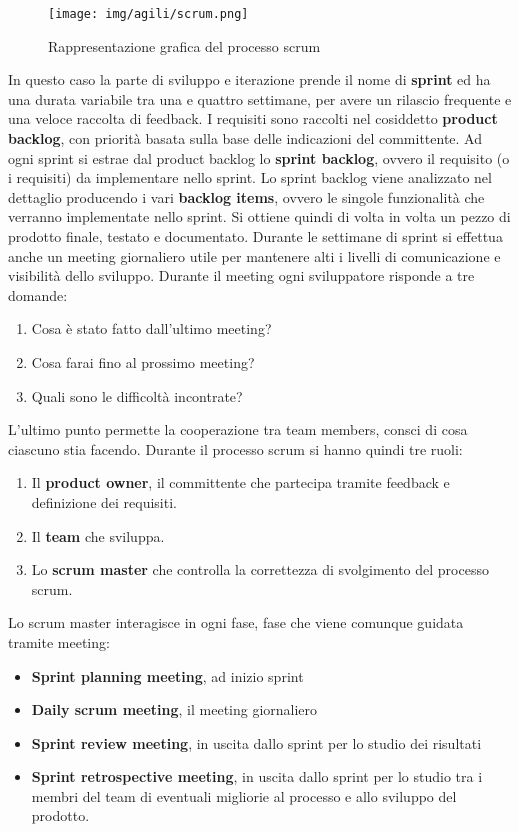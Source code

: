 \begin{figure}[!ht]
    \centering
    \texttt{[image: img/agili/scrum.png]}
    \caption{Rappresentazione grafica del processo scrum}
    \label{fig:scrum}
\end{figure}
In questo caso la parte di sviluppo e iterazione prende il nome di \textbf{sprint}
ed ha una durata variabile tra una e quattro settimane, per avere un rilascio
frequente e una veloce raccolta di feedback. I requisiti sono raccolti nel cosiddetto
\textbf{product backlog}, con priorità basata sulla base delle indicazioni del
committente. Ad ogni sprint si estrae dal product backlog lo \textbf{sprint backlog},
ovvero il requisito (o i requisiti) da implementare nello sprint. Lo sprint backlog
viene analizzato nel dettaglio producendo i vari \textbf{backlog items}, ovvero
le singole funzionalità che verranno implementate nello sprint. Si ottiene quindi
di volta in volta un pezzo di prodotto finale, testato e documentato. Durante le
settimane di sprint si effettua anche un meeting giornaliero utile per mantenere
alti i livelli di comunicazione e visibilità dello sviluppo. Durante il meeting
ogni sviluppatore risponde a tre domande:
\begin{enumerate}
    \item Cosa è stato fatto dall'ultimo meeting?
    \item Cosa farai fino al prossimo meeting?
    \item Quali sono le difficoltà incontrate?
\end{enumerate}

L’ultimo punto permette la cooperazione tra team members, consci di cosa ciascuno
stia facendo. Durante il processo scrum si hanno quindi tre ruoli:
\begin{enumerate}
    \item Il \textbf{product owner}, il committente che partecipa tramite feedback
          e definizione dei requisiti.
    \item Il \textbf{team} che sviluppa.
    \item Lo \textbf{scrum master} che controlla la correttezza di svolgimento
          del processo scrum.
\end{enumerate}

Lo scrum master interagisce in ogni fase, fase che viene comunque guidata tramite
meeting:
\begin{itemize}
    \item \textbf{Sprint planning meeting}, ad inizio sprint
    \item \textbf{Daily scrum meeting}, il meeting giornaliero
    \item \textbf{Sprint review meeting}, in uscita dallo sprint per lo studio dei
          risultati
    \item \textbf{Sprint retrospective meeting}, in uscita dallo sprint per lo
          studio tra i membri del team di eventuali migliorie al processo e allo sviluppo del prodotto.
\end{itemize}

